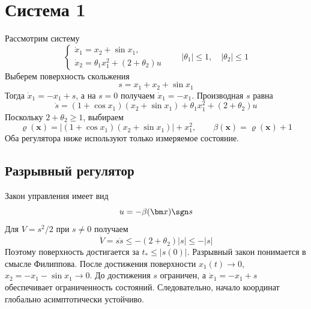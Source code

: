 
\setlength{\abovedisplayskip}{7pt}
\setlength{\belowdisplayskip}{7pt}
\setlength{\abovedisplayshortskip}{4pt}
\setlength{\belowdisplayshortskip}{4pt}

\makeatletter
\newenvironment{reportfigure}{%
  \par\addvspace{6pt}\noindent
  \begin{minipage}{\textwidth}\def\@captype{figure}\centering
}{\end{minipage}\par\vspace{4pt}}
\makeatother

\tableofcontents
\newpage

\section{Система 1}

Рассмотрим систему
\begin{equation}
  \begin{cases}
    \dot x_1=x_2+\sin x_1,\\
    \dot x_2=\theta_1x_1^2+(2+\theta_2)u
  \end{cases}
  \qquad |\theta_1|\le1,\quad |\theta_2|\le1
\end{equation}
Выберем поверхность скольжения
\begin{equation}
  s=x_1+x_2+\sin x_1
\end{equation}
Тогда $\dot x_1=-x_1+s$, а на $s=0$ получаем
$\dot x_1=-x_1$. Производная $s$ равна
\begin{equation}
  \dot s=(1+\cos x_1)(x_2+\sin x_1)+\theta_1x_1^2+(2+\theta_2)u
\end{equation}
Поскольку $2+\theta_2\ge1$, выбираем
\begin{equation}
  \varrho(\bm x)=\left|(1+\cos x_1)(x_2+\sin x_1)\right|+x_1^2,
  \qquad \beta(\bm x)=\varrho(\bm x)+1
\end{equation}
Оба регулятора ниже используют только измеряемое состояние.

\subsection{Разрывный регулятор}

Закон управления имеет вид
\begin{equation}
  u=-\beta(\bm x)\sgn s
\end{equation}
Для $V=s^2/2$ при $s\ne0$ получаем
\begin{equation}
  \dot V=s\dot s\le-(2+\theta_2)|s|\le-|s|
\end{equation}
Поэтому поверхность достигается за $t_*\le|s(0)|$.
Разрывный закон понимается в смысле Филиппова. После достижения
поверхности $x_1(t)\to0$, $x_2=-x_1-\sin x_1\to0$.
До достижения $s$ ограничен, а $\dot x_1=-x_1+s$ обеспечивает
ограниченность состояний. Следовательно, начало координат глобально
асимптотически устойчиво.

